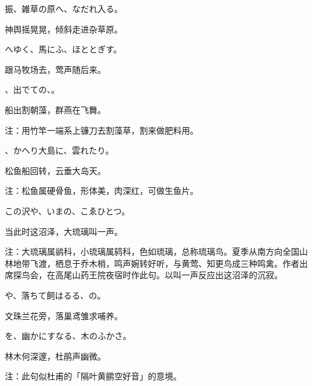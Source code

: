 \begin{haiku}
    {\FH {}振、雑草の原へ、なだれ入る。}

    {\FK 神舆摇晃晃，倾斜走进杂草原。}
\end{haiku}

\begin{haiku}
    {\FH {}へゆく、馬にふ、ほととぎす。}

    {\FK 跟马牧场去，莺声随后来。}
\end{haiku}

\begin{haiku}
    {\FH {}、出でての、。}

    {\FK 船出割朝藻，群燕在飞舞。}

    {\FT 注：用竹竿一端系上镰刀去割藻草，割来做肥料用。}
\end{haiku}

\begin{haiku}
    {\FH {}、かへり大島に、雲れたり。}

    {\FK 松鱼船回转，云垂大岛天。}

    {\FT 注：松鱼属硬骨鱼，形体美，肉深红，可做生鱼片。}
\end{haiku}

\begin{haiku}
    {\FH この沢や、いまの、こゑひとつ。}

    {\FK 当此时这沼泽，大琉璃叫一声。}

    {\FT 注：大琉璃属鹟科，小琉璃属鸫科，色如琉璃，总称琉璃鸟。夏季从南方向全国山林地带飞渡，栖息于乔木梢，鸣声婉转好听，与黄莺、知更鸟成三种鸣禽。作者出席探鸟会，在高尾山药王院夜宿时作此句。以叫一声反应出这沼泽的沉寂。}
\end{haiku}

\begin{haiku}
    {\FH {}や、落ちて飼はるる、の。}

    {\FK 文珠兰花旁，落巢鸢雏求哺养。}
\end{haiku}

\begin{haiku}
    {\FH {}を、幽かにすなる、木のふかさ。}

    {\FK 林木何深邃，杜鹃声幽微。}

    {\FT 注：此句似杜甫的「隔叶黄鹂空好音」的意境。}
\end{haiku}

